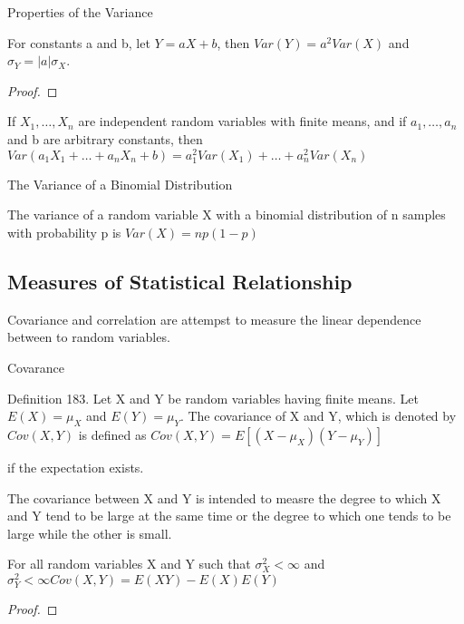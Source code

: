 Properties of the Variance

\begin{proposition}
For constants a and b, let $Y=aX+b$, then $Var\left(Y\right)=a^{2}Var\left(X\right)$
and $\sigma_{Y}=\left|a\right|\sigma_{X}$.
\end{proposition}
\begin{proof}
\end{proof}

{\color{red} If $X_{\text{1}},\ldots,X_{n}$ are independent random variables with finite means, and if $a_{1},\ldots,a_{n}$ and b are arbitrary constants, then $Var\left(a_{1}X_{1}+\ldots+a_{n}X_{n}+b\right)=a_{1}^{2}Var\left(X_{1}\right)+\ldots+a_{n}^{2}Var\left(X_{n}\right)$}

\begin{example}
The Variance of a Binomial Distribution

The variance of a random variable X with a binomial distribution of n samples with probability p is $Var\left(X\right)=np\left(1-p\right)$
\end{example}


\subsection{Measures of Statistical Relationship}



Covariance and correlation are attempst to measure the linear dependence between to random variables.

Covarance

\begin{definition}
Definition 183. Let X and Y be random variables having finite means. Let $E\left(X\right)=\mu_{X}$ and $E\left(Y\right)=\mu_{Y}$. The covariance of X and Y, which is denoted by $Cov\left(X,Y\right)$ is defined as $Cov\left(X,Y\right)=E\left[\left(X-\mu_{X}\right)\left(Y-\mu_{Y}\right)\right]$
\end{definition}

if the expectation exists.

The covariance between X and Y is intended to measre the degree to which X and Y tend to be large at the same time or the degree to which one tends to be large while the other is small.

\begin{proposition}
For all random variables X and Y such that $\sigma_{X}^{2}<\infty$ and $\sigma_{Y}^{2}<\infty Cov\left(X,Y\right)=E\left(XY\right)-E\left(X\right)E\left(Y\right)$
\end{proposition}
\begin{proof}
\end{proof}

